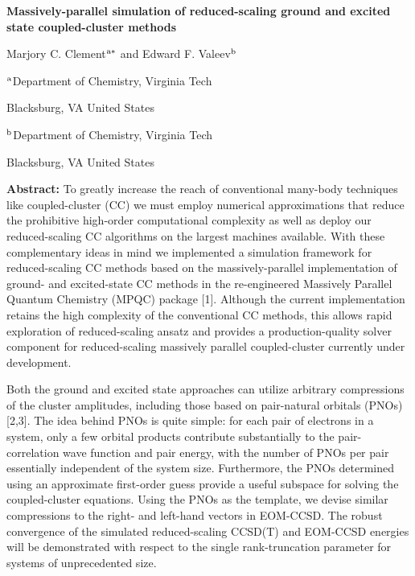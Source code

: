 \documentclass[12pt]{article}
\begin{document}
\centerline{\bf Massively-parallel simulation of reduced-scaling ground and excited state coupled-cluster methods}

\vspace{12pt}

\centerline{ {Marjory C. Clement}$^{\rm a*}$ and {Edward F. Valeev}$^{\rm b}$}

\vspace{12pt}

\centerline{$^{\rm a}$Department of Chemistry, Virginia Tech}
\centerline{Blacksburg, VA United States}

\vspace{12pt}

\centerline{$^{\rm b}$Department of Chemistry, Virginia Tech}
\centerline{Blacksburg, VA United States}

\vspace{12pt}

\vspace{24pt}

{\bf Abstract:} To greatly increase the reach of conventional many-body techniques like
coupled-cluster (CC) we must employ numerical approximations that reduce the prohibitive high-order
computational complexity as well as deploy our reduced-scaling CC algorithms on the largest machines
available. With these complementary ideas in mind we implemented a simulation framework for reduced-scaling
CC methods based on the massively-parallel implementation
of ground- and excited-state CC methods in the re-engineered Massively Parallel Quantum Chemistry (MPQC)
package [1]. Although the current implementation retains the high complexity of the conventional CC methods,
this allows rapid exploration of reduced-scaling ansatz and provides a production-quality
solver component for reduced-scaling massively parallel coupled-cluster currently under development. 

Both the ground and excited state approaches can utilize arbitrary compressions of the cluster amplitudes,
including those based on pair-natural orbitals (PNOs) [2,3]. The idea behind PNOs
is quite simple: for each pair of electrons in a system,
only a few orbital products contribute substantially
to the pair-correlation wave function and pair energy, with the number of PNOs per pair essentially independent of the system size.
Furthermore, the PNOs determined using an approximate
first-order guess provide a useful subspace for solving the coupled-cluster equations.
Using the PNOs as the template, we devise similar compressions to the right- and left-hand vectors in EOM-CCSD.
The robust convergence of the simulated reduced-scaling CCSD(T) and EOM-CCSD energies will be demonstrated
with respect to the single rank-truncation parameter for systems of unprecedented size.
\end{document}
